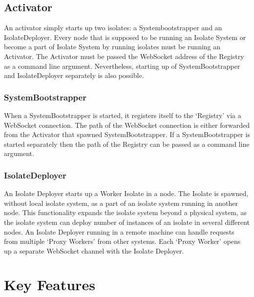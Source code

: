 \subsection{Activator}
  An activator simply starts up two isolates: a Systembootstrapper and an IsolateDeployer. Every node that is supposed to be running an Isolate System or become a part of Isolate System by running isolates must be running an Activator. The Activator must be passed the WebSocket address of the Registry as a command line argument. Nevertheless, starting up of SystemBootstrapper and IsolateDeployer separately is also possible.

  \subsubsection{SystemBootstrapper}
When a SystemBootstrapper is started, it registers itself to the ‘Registry’ via a WebSocket connection. The path of the WebSocket connection is either forwarded from the Activator that spawned SystemBootstrapper. If a SystemBootstrapper is started separately then the path of the Registry can be passed as a command line argument.

  \subsubsection{IsolateDeployer}
An Isolate Deployer starts up a Worker Isolate in a node. The Isolate is spawned, without local isolate system, as a part of an isolate system running in another node. This functionality expands the isolate system beyond a physical system, as the isolate system can deploy number of instances of an isolate in several different nodes.
  An Isolate Deployer running in a remote machine can handle requests from multiple ‘Proxy Workers’ from other systems. Each ‘Proxy Worker’ opens up a separate WebSocket channel with the Isolate Deployer.

\section{Key Features}
